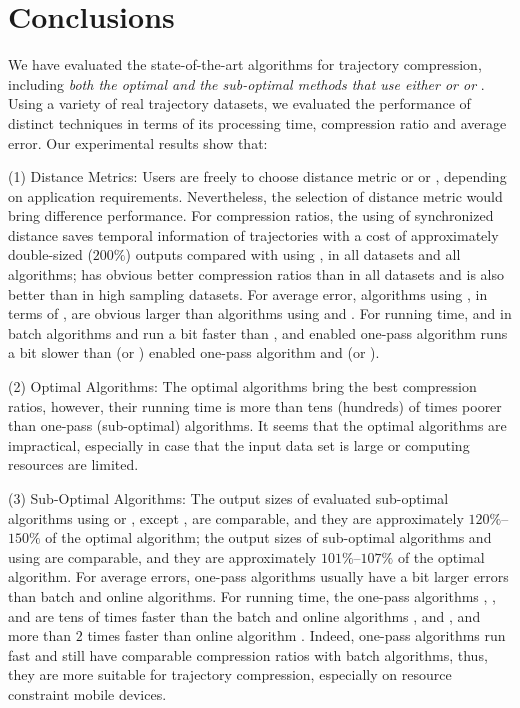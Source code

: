 \vspace{-1ex}
\section{Conclusions}

We have evaluated the state-of-the-art \lsa algorithms for trajectory compression, including \emph{both the optimal and the sub-optimal methods that use either \ped or \sed or \dad}.
Using a variety of real trajectory datasets, we evaluated the performance of distinct techniques in terms of its processing time, compression ratio and average error.
Our experimental results show that:

(1) Distance Metrics: Users are freely to choose distance metric \sed or \ped or \dad, depending on application requirements. Nevertheless, the selection of distance metric would bring difference performance.
For compression ratios, the using of synchronized distance \sed saves temporal information of trajectories with a cost of approximately double-sized (\ie $200\%$) outputs compared with using \ped, in all datasets and all algorithms; \ped has obvious better compression ratios than \dad in all datasets and \sed is also better than \dad in high sampling datasets.
For average error, algorithms using \dad, in terms of \ped, are obvious larger than algorithms using \ped and \sed.
For running time, \sed and \dad in batch algorithms \dpa and \tpa run a bit faster than \ped, and \sed enabled one-pass algorithm \cised runs a bit slower than \ped (or \dad) enabled one-pass algorithm \siped and \operb (or \interval).

(2) Optimal Algorithms: The optimal algorithms bring the best compression ratios, however, their running time is more than tens (hundreds) of times poorer than one-pass (sub-optimal) algorithms. It seems that the optimal algorithms are impractical, especially in case that the input data set is large or computing resources are limited.

(3) Sub-Optimal Algorithms: The output sizes of evaluated sub-optimal algorithms using \ped or \sed, except \squishe, are comparable, and they are approximately $120\%$--$150\%$ of the optimal algorithm; the output sizes of sub-optimal algorithms \tpa and \interval using \dad are comparable, and they are approximately $101\%$--$107\%$ of the optimal algorithm. 
For average errors, one-pass algorithms usually have a bit larger errors than batch and online algorithms.
For running time, the one-pass algorithms \siped, \operb, \cised and \interval are tens of times faster than the batch and online algorithms \tpa, \dpa and \bqsa, and more than $2$ times faster than online algorithm \squishe. Indeed, one-pass algorithms run fast and still have comparable compression ratios with batch algorithms, thus, they are more suitable for trajectory compression, especially on resource constraint mobile devices.

